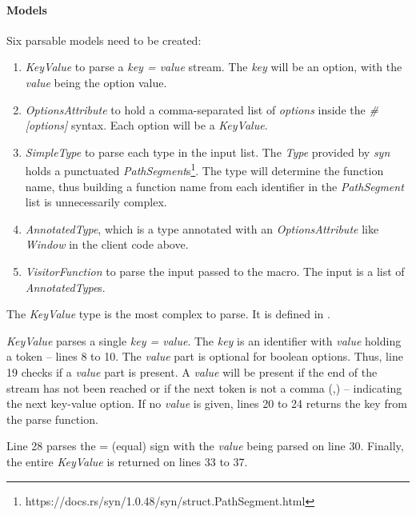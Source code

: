 \paragraph{Models}
Six parsable models need to be created:
\begin{enumerate}
	\item \textit{KeyValue} to parse a \textit{key = value} stream.
	      The \textit{key} will be an option, with the \textit{value} being the option value.
	\item \textit{OptionsAttribute} to hold a comma-separated list of \textit{options} inside the \textit{\#[options]} syntax.
	      Each option will be a \textit{KeyValue}.
	\item \textit{SimpleType} to parse each type in the input list.
	      The \textit{Type} provided by \textit{syn} holds a punctuated \textit{PathSegment}s\footnote{https://docs.rs/syn/1.0.48/syn/struct.PathSegment.html}.
	      The type will determine the function name, thus building a function name from each identifier in the \textit{PathSegment} list is unnecessarily complex.
	\item \textit{AnnotatedType}, which is a type annotated with an \textit{OptionsAttribute} like \textit{Window} in the client code above.
	\item \textit{VisitorFunction} to parse the input passed to the macro.
	      The input is a list of \textit{AnnotatedType}s.
\end{enumerate}

The \textit{KeyValue} type is the most complex to parse.
It is defined in .


\textit{KeyValue} parses a single \textit{key = value}.
The \textit{key} is an identifier with \textit{value} holding a token -- lines 8 to 10.
The \textit{value} part is optional for boolean options.
Thus, line 19 checks if a \textit{value} part is present.
A \textit{value} will be present if the end of the stream has not been reached or if the next token is not a comma (,) -- indicating the next key-value option.
If no \textit{value} is given, lines 20 to 24 returns the key from the parse function.

Line 28 parses the = (equal) sign with the \textit{value} being parsed on line 30.
Finally, the entire \textit{KeyValue} is returned on lines 33 to 37.

